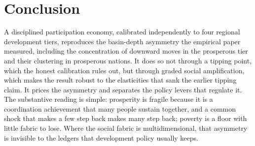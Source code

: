 \documentclass[11pt]{article}
\begin{document}
\section{Conclusion}

A disciplined participation economy, calibrated independently to four
regional development tiers, reproduces the basin-depth asymmetry the
empirical paper measured, including the concentration of downward moves in
the prosperous tier and their clustering in prosperous nations. It does so
not through a tipping point, which the honest calibration rules out, but
through graded social amplification, which makes the result robust to the
elasticities that sank the earlier tipping claim. It prices the asymmetry
and separates the policy levers that regulate it. The substantive reading is
simple: prosperity is fragile because it is a coordination achievement that
many people sustain together, and a common shock that makes a few step back
makes many step back; poverty is a floor with little fabric to lose. Where
the social fabric is multidimensional, that asymmetry is invisible to the
ledgers that development policy usually keeps.



\end{document}
